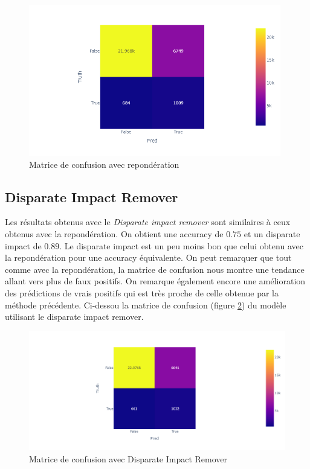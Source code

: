 \documentclass{article}
\begin{document}
    \begin{figure}[h]
        \centering
        \includegraphics[width=11cm]{./img/confusion_matrix_reweight.png}
        \caption{Matrice de confusion avec repondération}
        \label{fig:reweight_matrix}
    \end{figure}

    \subsection{Disparate Impact Remover}
    Les résultats obtenus avec le \textit{Disparate impact remover} sont similaires à ceux obtenus avec 
    la repondération. On obtient une accuracy de $0.75$ et un disparate impact de $0.89$. Le disparate 
    impact est un peu moins bon que celui obtenu avec la repondération pour une accuracy équivalente.
    On peut remarquer que tout comme avec la repondération, la matrice de confusion nous montre une 
    tendance allant vers plus de faux positifs. On remarque également encore une amélioration des prédictions 
    de vrais positifs qui est très proche de celle obtenue par la méthode précédente. 
    Ci-dessou la matrice de confusion (figure \ref{fig:DIR_matrix}) du modèle utilisant le disparate impact remover.

    \begin{figure}[h]
        \centering
        \includegraphics[width=\textwidth]{./img/DIR_confusion_matrix.png}
        \caption{Matrice de confusion avec Disparate Impact Remover}
        \label{fig:DIR_matrix}
    \end{figure}
\end{document}
